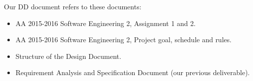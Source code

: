 Our DD document refers to these documents:
\begin{itemize}
   \item AA 2015-2016 Software Engineering 2, Assignment 1 and 2.
   \item AA 2015-2016 Software Engineering 2, Project goal, schedule and rules.
   \item Structure of the Design Document.
   \item Requirement Analysis and Specification Document (our previous deliverable).
\end{itemize}
